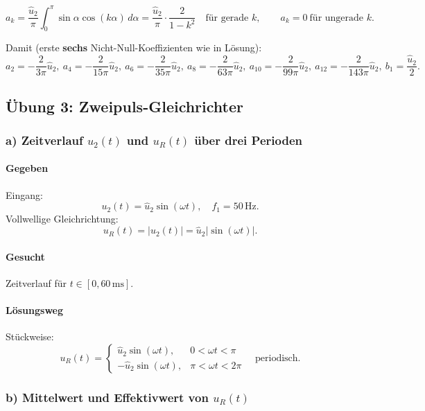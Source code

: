 \[
a_k=\frac{\hat u_2}{\pi}\int_0^{\pi}\sin\alpha\cos(k\alpha)\,d\alpha
=
\frac{\hat u_2}{\pi}\cdot\frac{2}{1-k^2}
\quad\text{für gerade }k,
\qquad
a_k=0\ \text{für ungerade }k.
\]

Damit (erste \textbf{sechs} Nicht-Null-Koeffizienten wie in Lösung):
\[
\boxed{
a_2=-\frac{2}{3\pi}\hat u_2,\ 
a_4=-\frac{2}{15\pi}\hat u_2,\ 
a_6=-\frac{2}{35\pi}\hat u_2,\ 
a_8=-\frac{2}{63\pi}\hat u_2,\ 
a_{10}=-\frac{2}{99\pi}\hat u_2,\ 
a_{12}=-\frac{2}{143\pi}\hat u_2,\ 
b_1=\frac{\hat u_2}{2}
}.
\]



\subsection{Übung 3: Zweipuls-Gleichrichter}

\subsubsection*{a) Zeitverlauf $u_2(t)$ und $u_R(t)$ über drei Perioden}

\paragraph{Gegeben}
Eingang:
\[
u_2(t)=\hat u_2\sin(\omega t),\quad f_1=50\,\mathrm{Hz}.
\]
Vollwellige Gleichrichtung:
\[
u_R(t)=|u_2(t)|=\hat u_2|\sin(\omega t)|.
\]

\paragraph{Gesucht}
Zeitverlauf für $t\in[0,60\,\mathrm{ms}]$.

\paragraph{Lösungsweg}
Stückweise:
\[
u_R(t)=
\begin{cases}
\hat u_2\sin(\omega t), & 0<\omega t<\pi\\
-\hat u_2\sin(\omega t), & \pi<\omega t<2\pi
\end{cases}
\quad\text{periodisch}.
\]

\subsubsection*{b) Mittelwert und Effektivwert von $u_R(t)$}

